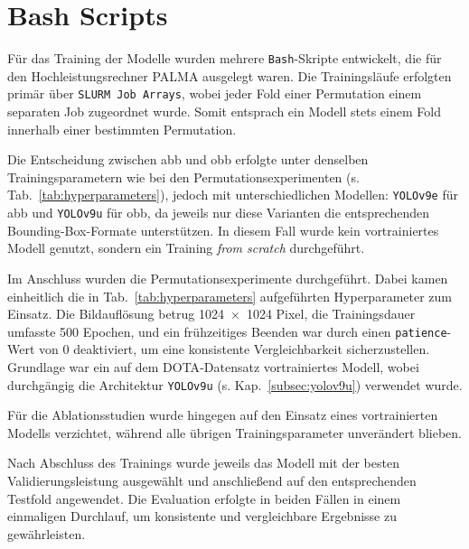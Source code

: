 \section{Bash Scripts}

Für das Training der Modelle wurden mehrere \texttt{Bash}-Skripte entwickelt, die für den Hochleistungsrechner \acrshort{PALMA} ausgelegt waren. Die Trainingsläufe erfolgten primär über \texttt{\acrshort{SLURM} Job Arrays}, wobei jeder Fold einer Permutation einem separaten Job zugeordnet wurde. Somit entsprach ein Modell stets einem Fold innerhalb einer bestimmten Permutation.  

Die Entscheidung zwischen \acrlong{abb} und \acrlong{obb} erfolgte unter denselben Trainingsparametern wie bei den Permutationsexperimenten (s. Tab.~\ref{tab:hyperparameters}), jedoch mit unterschiedlichen Modellen: \texttt{YOLOv9e} für \acrshort{abb} und \texttt{YOLOv9u} für \acrshort{obb}, da jeweils nur diese Varianten die entsprechenden Bounding-Box-Formate unterstützen. In diesem Fall wurde kein vortrainiertes Modell genutzt, sondern ein Training \textit{from scratch} durchgeführt.  

Im Anschluss wurden die Permutationsexperimente durchgeführt. Dabei kamen einheitlich die in Tab.~\ref{tab:hyperparameters} aufgeführten Hyperparameter zum Einsatz. Die Bildauflösung betrug 1024~$\times$~1024 Pixel, die Trainingsdauer umfasste 500 Epochen, und ein frühzeitiges Beenden war durch einen \texttt{patience}-Wert von 0 deaktiviert, um eine konsistente Vergleichbarkeit sicherzustellen. Grundlage war ein auf dem \acrshort{DOTA}-Datensatz vortrainiertes Modell, wobei durchgängig die Architektur \texttt{YOLOv9u} (s. Kap.~\ref{subsec:yolov9u}) verwendet wurde.  

Für die Ablationsstudien wurde hingegen auf den Einsatz eines vortrainierten Modells verzichtet, während alle übrigen Trainingsparameter unverändert blieben.  

Nach Abschluss des Trainings wurde jeweils das Modell mit der besten Validierungsleistung ausgewählt und anschließend auf den entsprechenden Testfold angewendet. Die Evaluation erfolgte in beiden Fällen in einem einmaligen Durchlauf, um konsistente und vergleichbare Ergebnisse zu gewährleisten.  



